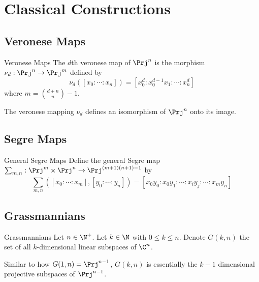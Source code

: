 \documentclass[a4paper]{article}
\begin{document}
\pagebreak
\section{Classical Constructions}
\subsection{Veronese Maps}
\begin{defn}{Veronese Maps}{} The $d$th veronese map of $\Prj^n$ is the morphism $\nu_d:\Prj^n\to\Prj^m$ defined by $$\nu_d([x_0:\cdots:x_n])=[x_0^d:x_0^{d-1}x_1:\cdots:x_n^d]$$ where $m=\binom{d+n}{n}-1$. 
\end{defn}

\begin{prp}{}{} The veronese mapping $\nu_d$ defines an isomorphism of $\Prj^n$ onto its image. 
\end{prp}

\subsection{Segre Maps}
\begin{defn}{General Segre Maps}{} Define the general Segre map $\sum_{m,n}:\Prj^m\times\Prj^n\to\Prj^{(m+1)(n+1)-1}$ by $$\sum_{m,n}([x_0:\cdots:x_m],[y_0:\cdots:y_n])=[x_0y_0:x_0y_1:\cdots:x_iy_j:\cdots:x_my_n]$$
\end{defn}

\subsection{Grassmannians}
\begin{defn}{Grassmannians}{} Let $n\in\N^+$. Let $k\in\N$ with $0\leq k\leq n$. Denote $G(k,n)$ the set of all $k$-dimensional linear subspaces of $\C^n$. 
\end{defn}

Similar to how $G(1,n)=\Prj^{n-1}$, $G(k,n)$ is essentially the $k-1$ dimensional projective subspaces of $\Prj^{n-1}$. 
\end{document}
